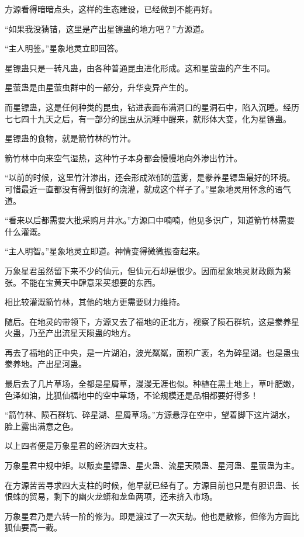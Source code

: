 \begin{this_body}
方源看得暗暗点头，这样的生态建设，已经做到不能再好。

“如果我没猜错，这里是产出星镖蛊的地方吧？”方源道。

“主人明鉴。”星象地灵立即回答。

星镖蛊只是一转凡蛊，由各种普通昆虫进化形成。这和星萤蛊的产生不同。

星萤蛊是由星萤虫群中的一部分，升华变异产生的。

而星镖蛊，这是任何种类的昆虫，钻进表面布满洞口的星洞石中，陷入沉睡。经历七七四十九天之后，有一部分的昆虫从沉睡中醒来，就形体大变，化为星镖蛊。

星镖蛊的食物，就是箭竹林的竹汁。

箭竹林中向来空气湿热，这种竹子本身都会慢慢地向外渗出竹汁。

“以前的时候，这里竹汁渗出，还会形成浓郁的蓝雾，是豢养星镖蛊最好的环境。可惜最近一直都没有得到很好的浇灌，就成这个样子了。”星象地灵用怀念的语气道。

“看来以后都需要大批采购月井水。”方源口中喃喃，他见多识广，知道箭竹林需要什么灌溉。

“主人明智。”星象地灵立即道。神情变得微微振奋起来。

万象星君虽然留下来不少的仙元，但仙元石却是很少。因而星象地灵财政颇为紧张。不能在宝黄天中肆意采买想要的东西。

相比较灌溉箭竹林，其他的地方更需要财力维持。

随后。在地灵的带领下，方源又去了福地的正北方，视察了陨石群坑，这是豢养星火蛊，乃至产出流星天陨蛊的地方。

再去了福地的正中央，是一片湖泊，波光粼粼，面积广袤，名为碎星湖。也是蛊虫豢养地。产出星河蛊。

最后去了几片草场，全都是星屑草，漫漫无涯也似。种植在黑土地上，草叶肥嫩，色泽如油，比狐仙福地中的空中草场，不论规模还是品相都要好得多！

“箭竹林、陨石群坑、碎星湖、星屑草场。”方源悬浮在空中，望着脚下这片湖水，脸上露出满意之色。

以上四者便是万象星君的经济四大支柱。

万象星君中规中矩。以贩卖星镖蛊、星火蛊、流星天陨蛊、星河蛊、星萤蛊为主。

在方源苦苦寻求四大支柱的时候，他早就已经有了。方源目前也只是有胆识蛊、长恨蛛的贸易，剩下的幽火龙蟒和龙鱼两项，还未挤入市场。

万象星君乃是六转一阶的修为。即是渡过了一次天劫。他也是散修，但修为方面比狐仙要高一截。


\end{this_body}
